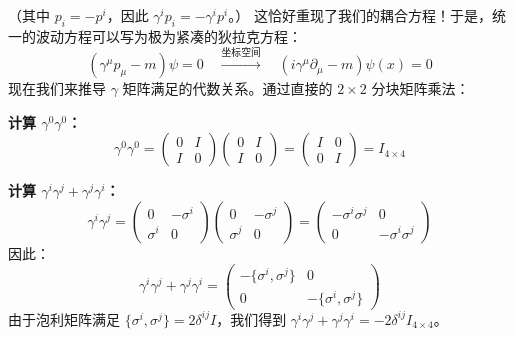 （其中 $p_i = -p^i$，因此 $\gamma^i p_i = -\gamma^i p^i$。）
这恰好重现了我们的耦合方程！于是，统一的波动方程可以写为极为紧凑的狄拉克方程：
\begin{equation}
    (\gamma^\mu p_\mu - m)\psi = 0 \quad \xrightarrow{\text{坐标空间}} \quad (i\gamma^\mu \partial_\mu - m)\psi(x) = 0
\end{equation}
现在我们来推导 $\gamma$ 矩阵满足的代数关系。通过直接的 $2 \times 2$ 分块矩阵乘法：
\vspace{2ex}\par 
\textbf{计算 $\gamma^0 \gamma^0$：}
\begin{equation}
    \gamma^0 \gamma^0 = \begin{pmatrix} 0 & I \\ I & 0 \end{pmatrix} \begin{pmatrix} 0 & I \\ I & 0 \end{pmatrix} = \begin{pmatrix} I & 0 \\ 0 & I \end{pmatrix} = I_{4\times 4}
\end{equation}

\textbf{计算 $\gamma^i \gamma^j + \gamma^j \gamma^i$：}
\begin{equation}
    \gamma^i \gamma^j = \begin{pmatrix} 0 & -\sigma^i \\ \sigma^i & 0 \end{pmatrix} \begin{pmatrix} 0 & -\sigma^j \\ \sigma^j & 0 \end{pmatrix} = \begin{pmatrix} -\sigma^i\sigma^j & 0 \\ 0 & -\sigma^i\sigma^j \end{pmatrix}
\end{equation}
因此：
\begin{equation}
    \gamma^i \gamma^j + \gamma^j \gamma^i = \begin{pmatrix} -\{\sigma^i, \sigma^j\} & 0 \\ 0 & -\{\sigma^i, \sigma^j\} \end{pmatrix}
\end{equation}
由于泡利矩阵满足 $\{\sigma^i, \sigma^j\} = 2\delta^{ij} I$，我们得到 $\gamma^i \gamma^j + \gamma^j \gamma^i = -2\delta^{ij} I_{4\times 4}$。

